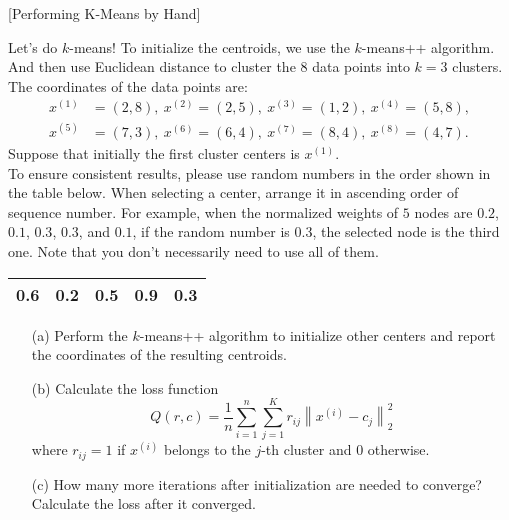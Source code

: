 \item {} [Performing K-Means by Hand]

Let's do $k$-means! To initialize the centroids, we use the $k$-means++ algorithm. And then use Euclidean distance to cluster the 8 data points into $k=3$ clusters. The coordinates of the data points are:
\begin{align*}
    x^{(1)} & = (2,8),  \ x^{(2)} = (2,5), \ x^{(3)} = (1,2), \ x^{(4)} = (5,8), \\
    x^{(5)} & = (7,3),  \ x^{(6)} = (6,4), \ x^{(7)} = (8,4), \ x^{(8)} = (4,7).
\end{align*}
Suppose that initially the first cluster centers is $x^{(1)}$. \\
{\color{blue} To ensure consistent results, please use random numbers in the order shown in the table below. When selecting a center, arrange it in ascending order of sequence number. For example, when the normalized weights of $5$ nodes are $0.2$, $0.1$, $0.3$, $0.3$, and $0.1$, if the random number is $0.3$, the selected node is the third one. Note that you don't necessarily need to use all of them.}
\begin{table*}[h]
    \centering
    \begin{tabular}{|c|c|c|c|c|}
    \hline
    0.6 & 0.2 & 0.5 & 0.9 & 0.3 \\
    \hline
    \end{tabular}
\end{table*}

\begin{itemize}
\item[(a)] Perform the $k$-means++ algorithm to initialize other centers and report the coordinates of the resulting centroids. ~
\item[(b)] Calculate the loss function
$$Q(r,c) = \dfrac{1}{n} \sum_{i=1}^n \sum_{j=1}^K r_{ij}\left\|x^{(i)} - c_j\right\|_2^2$$
where $r_{ij} = 1$ if $x^{(i)}$ belongs to the $j$-th cluster and 0 otherwise. ~
\item[(c)] How many more iterations after initialization are needed to converge? ~ Calculate the loss after it converged. ~
\end{itemize}

\solution

